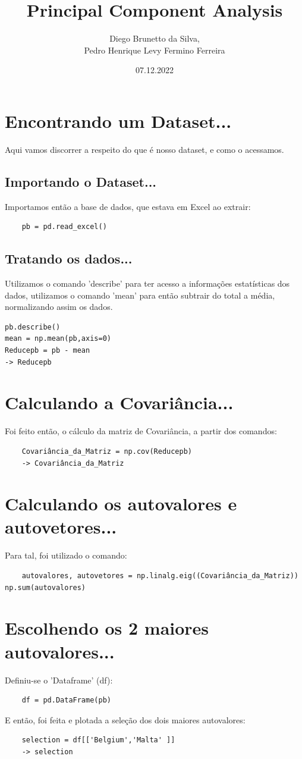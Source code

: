 \documentclass{article}
\title{Principal Component Analysis}
\author{Diego Brunetto da Silva,\\Pedro Henrique Levy Fermino Ferreira}
\date{07.12.2022}
\begin{document}
\maketitle
\section{Encontrando um Dataset...}
\par
Aqui vamos discorrer a respeito do que é nosso dataset, e como o acessamos.
\subsection{Importando o Dataset...}
\par
Importamos então a base de dados, que estava em Excel ao extrair:
\begin{verbatim}
    pb = pd.read_excel()
\end{verbatim}
\subsection{Tratando os dados...}
\par
Utilizamos o comando 'describe' para ter acesso a informações estatísticas dos dados, utilizamos o comando 'mean' para então subtrair do total a média, normalizando assim os dados.
\begin{verbatim}
pb.describe()
mean = np.mean(pb,axis=0)
Reducepb = pb - mean
-> Reducepb
\end{verbatim}
\section{Calculando a Covariância...}
\par
Foi feito então, o cálculo da matriz de Covariância, a partir dos comandos:
\begin{verbatim}
    Covariância_da_Matriz = np.cov(Reducepb)
    -> Covariância_da_Matriz	
\end{verbatim}
\section{Calculando os autovalores e autovetores...}
\par
Para tal, foi utilizado o comando:
\begin{verbatim}
    autovalores, autovetores = np.linalg.eig((Covariância_da_Matriz))
np.sum(autovalores)
\end{verbatim}
\section{Escolhendo os 2 maiores autovalores...}
Definiu-se o 'Dataframe' (df):
\begin{verbatim}
    df = pd.DataFrame(pb)
\end{verbatim}
E então, foi feita e plotada a seleção dos dois maiores autovalores:
\begin{verbatim}
    selection = df[['Belgium','Malta' ]]
    -> selection
\end{verbatim}
\end{document}
